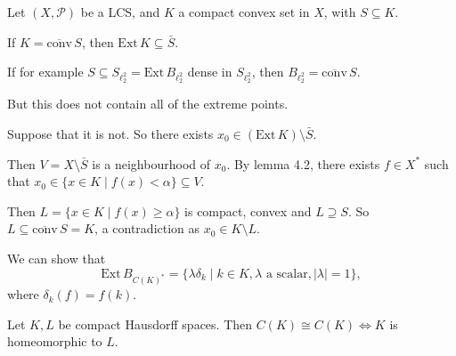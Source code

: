 \documentclass[12pt]{article}
\begin{document}
\begin{theorem}
	Let $(X, \mathcal{P})$ be a LCS, and $K$ a compact convex set in $X$, with $S \subseteq K$.

	If $K = \overline{\mathrm{conv}} \, S$, then $\mathrm{Ext}\, K \subseteq \bar S$.
\end{theorem}

\begin{exbox}
	If for example $S \subseteq S_{\ell_2^2} = \mathrm{Ext} \, B_{\ell_2^2}$ dense in $S_{\ell_2^2}$, then $B_{\ell_2^2} = \overline{\mathrm{conv}} \, S$.

	But this does not contain all of the extreme points.
\end{exbox}

\begin{proofbox}
	Suppose that it is not. So there exists $x_0 \in (\mathrm{Ext} \, K) \setminus \bar S$.

	Then $V = X \setminus \bar S$ is a neighbourhood of $x_0$. By lemma 4.2, there exists $f \in X^{\ast}$ such that $x_0 \in \{x \in K \mid f(x) < \alpha\} \subseteq V$.

	Then $L = \{x \in K \mid f(x) \geq \alpha\}$ is compact, convex and $L \supseteq S$. So $L \subseteq \overline{\mathrm{conv}} \, S = K$, a contradiction as $x_0 \in K \setminus L$.
\end{proofbox}

\begin{exbox}
	We can show that
	\[
		\mathrm{Ext} \, B_{C(K)^{\ast}} = \{\lambda \delta_k \mid k \in K, \lambda \text{ a scalar}, |\lambda| = 1\},
	\]
	where $\delta_k(f) = f(k)$.
\end{exbox}

\begin{theorem}
	Let $K, L$ be compact Hausdorff spaces. Then $C(K) \cong C(K) \iff K$ is homeomorphic to $L$.
\end{theorem}
\end{document}
